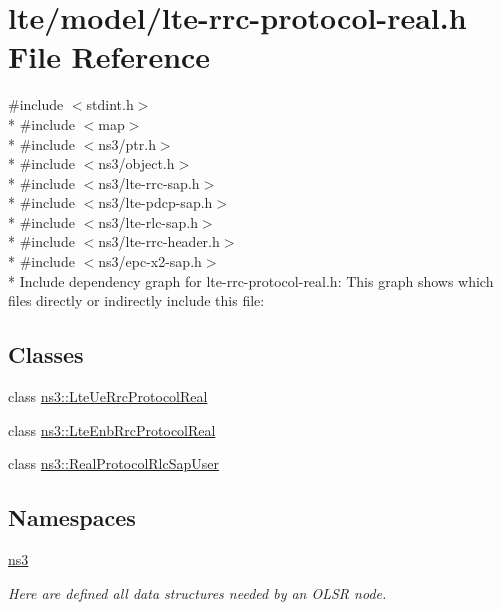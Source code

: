 \hypertarget{lte-rrc-protocol-real_8h}{}\section{lte/model/lte-\/rrc-\/protocol-\/real.h File Reference}
\label{lte-rrc-protocol-real_8h}
{\ttfamily \#include $<$stdint.\+h$>$}\\*
{\ttfamily \#include $<$map$>$}\\*
{\ttfamily \#include $<$ns3/ptr.\+h$>$}\\*
{\ttfamily \#include $<$ns3/object.\+h$>$}\\*
{\ttfamily \#include $<$ns3/lte-\/rrc-\/sap.\+h$>$}\\*
{\ttfamily \#include $<$ns3/lte-\/pdcp-\/sap.\+h$>$}\\*
{\ttfamily \#include $<$ns3/lte-\/rlc-\/sap.\+h$>$}\\*
{\ttfamily \#include $<$ns3/lte-\/rrc-\/header.\+h$>$}\\*
{\ttfamily \#include $<$ns3/epc-\/x2-\/sap.\+h$>$}\\*
Include dependency graph for lte-\/rrc-\/protocol-\/real.h\+:
This graph shows which files directly or indirectly include this file\+:
\subsection*{Classes}
\begin{DoxyCompactItemize}
\item 
class \hyperlink{classns3_1_1LteUeRrcProtocolReal}{ns3\+::\+Lte\+Ue\+Rrc\+Protocol\+Real}
\item 
class \hyperlink{classns3_1_1LteEnbRrcProtocolReal}{ns3\+::\+Lte\+Enb\+Rrc\+Protocol\+Real}
\item 
class \hyperlink{classns3_1_1RealProtocolRlcSapUser}{ns3\+::\+Real\+Protocol\+Rlc\+Sap\+User}
\end{DoxyCompactItemize}
\subsection*{Namespaces}
\begin{DoxyCompactItemize}
\item 
 \hyperlink{namespacens3}{ns3}
\begin{DoxyCompactList}\small\item\em Here are defined all data structures needed by an O\+L\+SR node. \end{DoxyCompactList}\end{DoxyCompactItemize}
